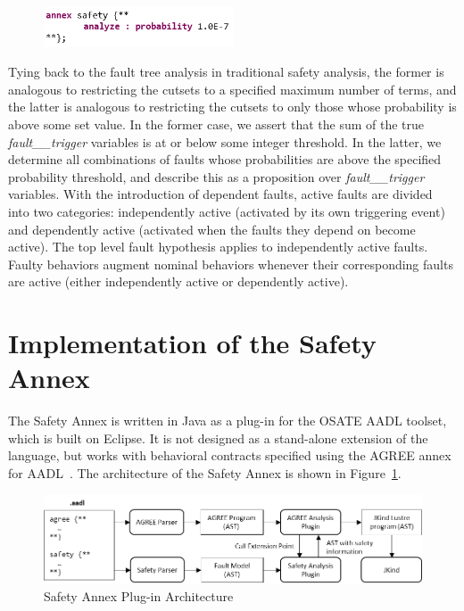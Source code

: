 \begin{figure}[h!]
	\vspace{-0.1in}
		\includegraphics[width=0.5\textwidth]{images/hypothesisProb.png}
	\vspace{-0.1in}
\end{figure}

Tying back to the fault tree analysis in traditional safety analysis, the former is analogous to restricting the cutsets to a specified maximum number of terms, and the latter is analogous to restricting the cutsets to only those whose probability is above some set value. In the former case, we assert that the sum of the true {\em fault\_\_trigger} variables is at or below some integer threshold.  In the latter, we determine all combinations of faults whose probabilities are above the specified probability threshold, and describe this as a proposition over {\em fault\_\_trigger} variables. 
%
With the introduction of dependent faults, active faults are divided into two categories: independently active (activated by its own triggering event) and dependently active (activated when the faults they depend on become active). The top level fault hypothesis applies to independently active faults. Faulty behaviors augment nominal behaviors whenever their corresponding faults are active (either independently active or dependently active).



\section{Implementation of the Safety Annex}
The Safety Annex is written in Java as a plug-in for the OSATE AADL toolset, which is built on Eclipse.  It is not designed as a stand-alone extension of the language, but works with behavioral contracts specified using the AGREE annex for AADL~\cite{NFM2012:CoGaMiWhLaLu}. 
The architecture of the Safety Annex is shown in Figure~\ref{fig:plugin-arch}.

\begin{figure}[h]
	\begin{center}
		\includegraphics[width=\textwidth]{images/arch.png}
	\end{center}
	\caption{Safety Annex Plug-in Architecture}
	\label{fig:plugin-arch}
\end{figure}

